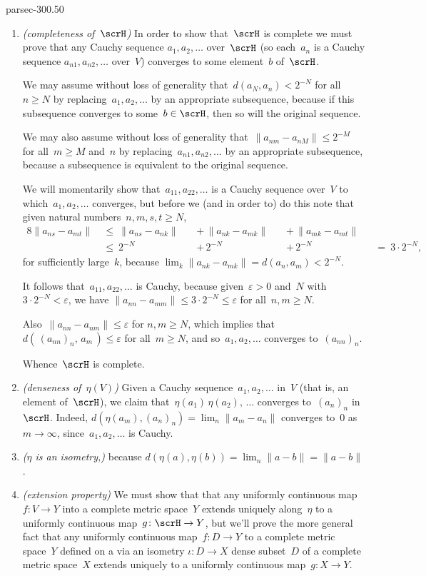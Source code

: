 \documentclass[b5page]{book}
\begin{document}
\begin{solution}{parsec-300.50}
\begin{enumerate}
\item \emph{(completeness of~$\scrH$)}
In order to show that~$\scrH$
is complete
we must prove that any
Cauchy sequence
$a_1,a_2,\dotsc$ over~$\scrH$
(so each~$a_n$ is a Cauchy sequence $a_{n1},a_{n2},\dotsc$
over~$V$) converges to some element~$b$ of~$\scrH$.

We may assume without loss of generality
that~$d(a_N,a_n)< 2^{-N}$
for all~$n\geq N$
by replacing~$a_1,a_2,\dotsc$
by an appropriate subsequence,
because if this subsequence converges to some~$b\in \scrH$,
then so will the original sequence.

We may also assume without loss of generality
that~$\|a_{nm}-a_{nM}\| \leq  2^{-M}$
for all~$m\geq M$ and~$n$
by replacing~$a_{n1},a_{n2},\dotsc$
by an appropriate subsequence,
because a subsequence is equivalent
to the original sequence.

We will momentarily show that~$a_{11},a_{22},\dotsc$
is a Cauchy sequence over~$V$
to which~$a_1,a_2,\dotsc$ converges,
but before we (and in order to) do this
note that given natural numbers~$n,m,s,t\geq N$,
\begin{alignat*}{8}
\|a_{ns}-a_{mt}\|\ &\leq\ 
\|a_{ns}-a_{nk}\|
\,&&+\,
\|a_{nk}-a_{mk}\|
\,&&+\,
\|a_{mk}-a_{mt}\|&& \\
\ &\leq\ 
 2^{-N}
&&+\, 2^{-N}
&&+\, 2^{-N}
\ &&=\ 3\cdot 2^{-N},
\end{alignat*}
for sufficiently large~$k$,
because 
$\textstyle{} \lim_k \|a_{nk}-a_{mk}\|
=d(a_n,a_m)
< 2^{-N}$.

It follows that~$a_{11},a_{22},\dotsc$
is Cauchy,
because given~$\varepsilon>0$
and~$N$ with $3\cdot 2^{-N}<\varepsilon$,
we have 
$\|a_{nn}-a_{mm}\|\leq 3\cdot 2^{-N}\leq \varepsilon$
for all~$n,m\geq N$.

Also~$\|a_{nn}-a_{nm}\|\leq \varepsilon$
for $n,m\geq N$,
which implies that $d(\,(a_{nn})_n,\, a_m\,)\leq \varepsilon$
for all~$m\geq N$,
and so~$a_1,a_2,\dotsc$ converges to~$(a_{nn})_n$.

Whence~$\scrH$ is complete.

\item
\label{S30Vdenseness}
\emph{(denseness of~$\eta(V)$)}
Given a Cauchy sequence~$a_1,a_2,\dotsc$ in~$V$
(that is, an element of~$\scrH$),
we claim that~$\eta(a_1)\,\eta(a_2),\,\dotsc$
converges to~$(a_n)_n$ in~$\scrH$.
Indeed, $d(\eta(a_m),(a_n)_n) = \lim_n\|a_m-a_n\|$
converges to~$0$ as~$m\to \infty$,
since~$a_1,a_2,\dotsc$ is Cauchy.

\item
\label{S30Visometry}
\emph{($\eta$ is an isometry,)}
because 
$d(\eta(a),\eta(b))
= \lim_n \|a-b\| = \|a-b\|$.
\item
\label{S30Vextension}
\emph{(extension property)}
We must show that that any
uniformly continuous map~$f\colon V\to Y$
into a complete metric space~$Y$
extends uniquely along~$\eta$ 
to a uniformly continuous map~$g\colon \scrH\to Y$,
but we'll prove the more general 
fact that any uniformly continuous map~$f\colon D\to Y$
to a complete metric space~$Y$
defined on a via an isometry $\iota\colon D\to X$ dense subset~$D$
of a complete metric space~$X$
extends uniquely to a uniformly continuous map~$g\colon X\to Y$.


\end{enumerate}
\end{solution}
\end{document}
